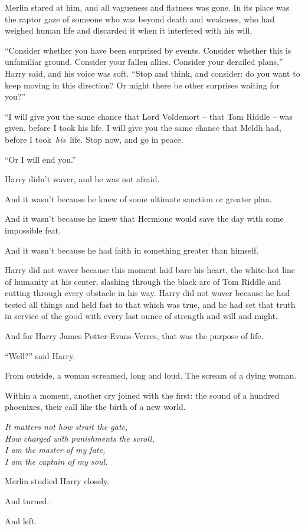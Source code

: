 Merlin stared at him, and all vagueness and flatness was gone. In its
place was the raptor gaze of someone who was beyond death and weakness,
who had weighed human life and discarded it when it interfered with his
will.

``Consider whether you have been surprised by events. Consider whether
this is unfamiliar ground. Consider your fallen allies. Consider your
derailed plans,'' Harry said, and his voice was soft. ``Stop and think,
and consider: do you want to keep moving in this direction? Or might
there be other surprises waiting for you?''

``I will give you the same chance that Lord Voldemort -- that Tom Riddle
-- was given, before I took his life. I will give you the same chance
that Meldh had, before I took~\emph{his}~life. Stop now, and go in
peace.

``Or I will end you.''

Harry didn't waver, and he was not afraid.

And it wasn't because he knew of some ultimate sanction or greater plan.

And it wasn't because he knew that Hermione would save the day with some
impossible feat.

And it wasn't because he had faith in something greater than himself.

Harry did not waver because this moment laid bare his heart, the
white-hot line of humanity at his center, slashing through the black arc
of Tom Riddle and cutting through every obstacle in his way. Harry did
not waver because he had tested all things and held fast to that which
was true, and he had set that truth in service of the good with every
last ounce of strength and will and might.

And for Harry James Potter-Evans-Verres, that was the purpose of life.

``Well?'' said Harry.

From outside, a woman screamed, long and loud. The scream of a dying
woman.

Within a moment, another cry joined with the first: the sound of a
hundred phoenixes, their call like the birth of a new world.

\mybreak

\emph{It matters not how strait the gate,}\\
\emph{How charged with punishments the scroll,}\\
\emph{I am the master of my fate,}\\
\emph{I am the captain of my soul.}\\


\mybreak

Merlin studied Harry closely.

And turned.

And left.
